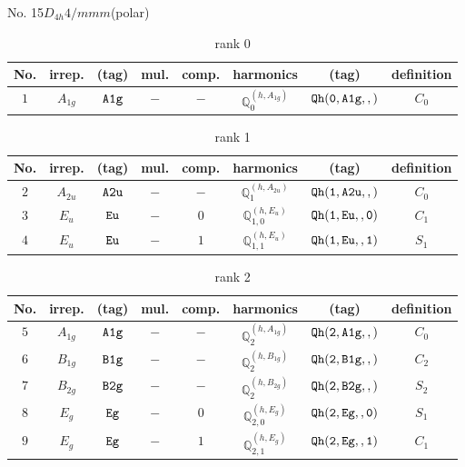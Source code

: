 \documentclass[fleqn,8pt]{jsarticle}
\begin{document}
\setcounter{MaxMatrixCols}{16}

\begin{center}
\LARGE
No. 15\quad$D_{4h}$\quad$4/mmm$\quad[ tetragonal ] (polar)
\end{center}
\begin{table}[ht!]
\begin{center}
\caption{rank 0}
\renewcommand{\arraystretch}{1.3}
\begin{tabular}{cccccccc} \hline \hline
No. & irrep. & (tag) & mul. & comp. & harmonics & (tag) & definition \\ \hline
$ 1 $ & $ A_{1g} $ & $ {\tt A1g} $ & $ - $ & $ - $ & $ \mathbb{Q}_{0}^{(h,A_{1g})} $ & $ {\tt Qh(0,A1g,,)} $ & $ C_{0} $ \\
 \hline \hline
\end{tabular}
\end{center}
\end{table}
\begin{table}[ht!]
\begin{center}
\caption{rank 1}
\renewcommand{\arraystretch}{1.3}
\begin{tabular}{cccccccc} \hline \hline
No. & irrep. & (tag) & mul. & comp. & harmonics & (tag) & definition \\ \hline
$ 2 $ & $ A_{2u} $ & $ {\tt A2u} $ & $ - $ & $ - $ & $ \mathbb{Q}_{1}^{(h,A_{2u})} $ & $ {\tt Qh(1,A2u,,)} $ & $ C_{0} $ \\
$ 3 $ & $ E_{u} $ & $ {\tt Eu} $ & $ - $ & $ 0 $ & $ \mathbb{Q}_{1,0}^{(h,E_{u})} $ & $ {\tt Qh(1,Eu,,0)} $ & $ C_{1} $ \\
$ 4 $ & $ E_{u} $ & $ {\tt Eu} $ & $ - $ & $ 1 $ & $ \mathbb{Q}_{1,1}^{(h,E_{u})} $ & $ {\tt Qh(1,Eu,,1)} $ & $ S_{1} $ \\
 \hline \hline
\end{tabular}
\end{center}
\end{table}
\begin{table}[ht!]
\begin{center}
\caption{rank 2}
\renewcommand{\arraystretch}{1.3}
\begin{tabular}{cccccccc} \hline \hline
No. & irrep. & (tag) & mul. & comp. & harmonics & (tag) & definition \\ \hline
$ 5 $ & $ A_{1g} $ & $ {\tt A1g} $ & $ - $ & $ - $ & $ \mathbb{Q}_{2}^{(h,A_{1g})} $ & $ {\tt Qh(2,A1g,,)} $ & $ C_{0} $ \\
$ 6 $ & $ B_{1g} $ & $ {\tt B1g} $ & $ - $ & $ - $ & $ \mathbb{Q}_{2}^{(h,B_{1g})} $ & $ {\tt Qh(2,B1g,,)} $ & $ C_{2} $ \\
$ 7 $ & $ B_{2g} $ & $ {\tt B2g} $ & $ - $ & $ - $ & $ \mathbb{Q}_{2}^{(h,B_{2g})} $ & $ {\tt Qh(2,B2g,,)} $ & $ S_{2} $ \\
$ 8 $ & $ E_{g} $ & $ {\tt Eg} $ & $ - $ & $ 0 $ & $ \mathbb{Q}_{2,0}^{(h,E_{g})} $ & $ {\tt Qh(2,Eg,,0)} $ & $ S_{1} $ \\
$ 9 $ & $ E_{g} $ & $ {\tt Eg} $ & $ - $ & $ 1 $ & $ \mathbb{Q}_{2,1}^{(h,E_{g})} $ & $ {\tt Qh(2,Eg,,1)} $ & $ C_{1} $ \\
 \hline \hline
\end{tabular}
\end{center}
\end{table}
\end{document}
